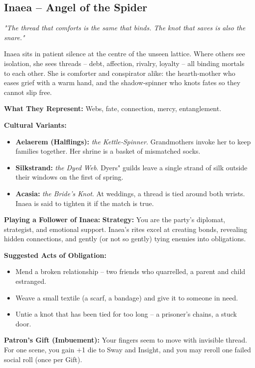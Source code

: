 \documentclass[10pt,a5paper]{book}
\begin{document}
\clearpage

\subsection{Inaea -- Angel of the Spider}
\label{patron:inae}

\textit{"The thread that comforts is the same that binds. The knot that saves is also the snare."}

Inaea sits in patient silence at the centre of the unseen lattice. Where others see isolation, she sees threads -- debt, affection, rivalry, loyalty -- all binding mortals to each other. She is comforter and conspirator alike: the hearth‑mother who eases grief with a warm hand, and the shadow‑spinner who knots fates so they cannot slip free.

\textbf{What They Represent:} Webs, fate, connection, mercy, entanglement.

\textbf{Cultural Variants:}
\begin{itemize}
    \item \textbf{Aelaerem (Halflings):} \textit{the Kettle‑Spinner}. Grandmothers invoke her to keep families together. Her shrine is a basket of mismatched socks.
    \item \textbf{Silkstrand:} \textit{the Dyed Web}. Dyers" guilds leave a single strand of silk outside their windows on the first of spring.
    \item \textbf{Acasia:} \textit{the Bride's Knot}. At weddings, a thread is tied around both wrists. Inaea is said to tighten it if the match is true.
\end{itemize}

\textbf{Playing a Follower of Inaea:}
\textbf{Strategy:} You are the party's diplomat, strategist, and emotional support. Inaea's rites excel at creating bonds, revealing hidden connections, and gently (or not so gently) tying enemies into obligations.

\textbf{Suggested Acts of Obligation:}
\begin{itemize}
    \item Mend a broken relationship -- two friends who quarrelled, a parent and child estranged.
    \item Weave a small textile (a scarf, a bandage) and give it to someone in need.
    \item Untie a knot that has been tied for too long -- a prisoner's chains, a stuck door.
\end{itemize}

\textbf{Patron's Gift (Imbuement):} Your fingers seem to move with invisible thread. For one scene, you gain +1 die to Sway and Insight, and you may reroll one failed social roll (once per Gift).
\end{document}
